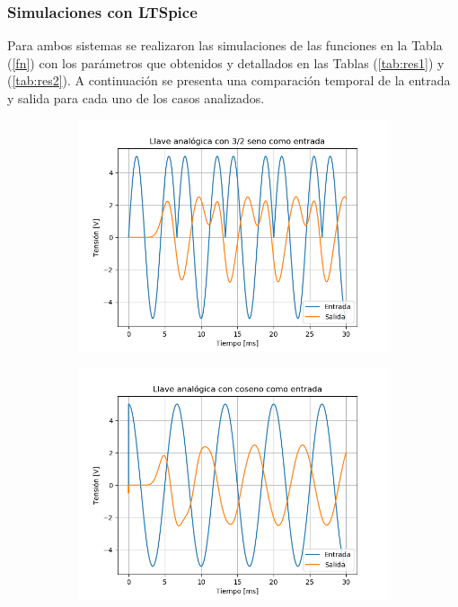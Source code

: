\subsubsection{Simulaciones con LTSpice}
Para ambos sistemas se realizaron las simulaciones de las funciones en la Tabla (\ref{fn}) con los parámetros que obtenidos y detallados en las Tablas (\ref{tab:res1}) y (\ref{tab:res2}). A continuación se presenta una comparación temporal de la entrada y salida para cada uno de los casos analizados.
\begin{figure}[H]
	\begin{subfigure}{.5\textwidth}
	\centering
	\includegraphics[width=\textwidth]{ImagenesEjercicio6/LA - 3 2.png}
	\end{subfigure}	
	\begin{subfigure}{.5\textwidth}
	\centering
	\includegraphics[width=\textwidth]{ImagenesEjercicio6/LA - Cos.png}
	\end{subfigure}
	

\end{figure}
